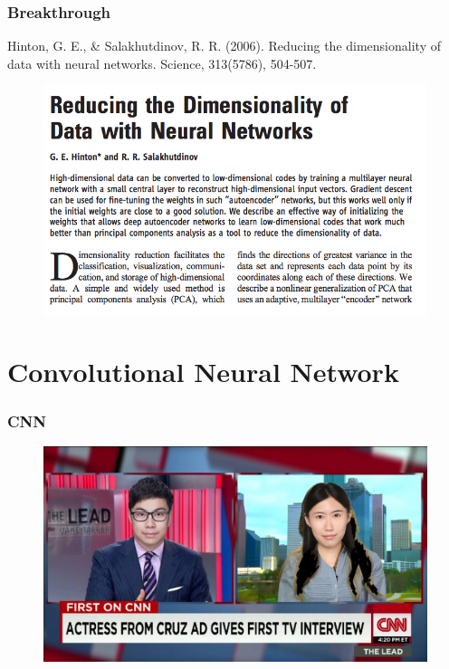 \documentclass{beamer}
\begin{document}
\begin{frame}
	\frametitle{Breakthrough}
	{\small Hinton, G. E., \& Salakhutdinov, R. R. (2006). Reducing the dimensionality of data with neural networks. Science, 313(5786), 504-507.}
	\begin{figure}
		\includegraphics[width=0.95\linewidth]{breakthrough}
	\end{figure}
\end{frame}

\section{Convolutional Neural Network}
\begin{frame}
	\frametitle{CNN}
	\begin{figure}
		\includegraphics[width=\linewidth]{cnn_tv_dapeng}
	\end{figure}
\end{frame}
\end{document}
